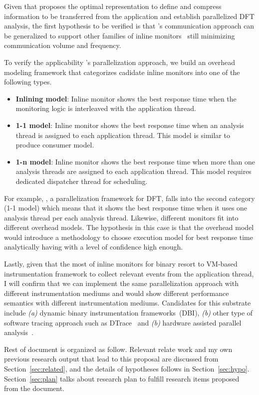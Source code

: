 %
%
Given that \sreplica proposes the optimal representation to define and compress
information to be transferred from the application and establish parallelized
DFT analysis, the first hypothesis to be verified is that \sreplica's
communication approach can be generalized to support other families of inline
monitors~\cite{cab:oopsala2009} still minimizing communication volume and
frequency.

To verify the applicability \sreplica's parallelization approach, we build an
overhead modeling framework that categorizes cadidate inline monitors into one
of the following types.

\begin{itemize}

    \item {\bf Inlining model}: Inline monitor shows the best response time
            when the monitoring logic is interleaved with the application
            thread.

    \item {\bf 1-1 model}: Inline monitor shows the best response time when an
            analysis thread is assigned to each application thread. This model
            is similar to produce consumer model.

    \item {\bf 1-n model}: Inline monitor shows the best response time when
            more than one analysis threads are assigned to each application
            thread.  This model requires dedicated dispatcher thread for
            scheduling.
    \end{itemize}

For example, \sreplica, a parallelization framework for DFT,  falls into the
second category (1-1 model) which means that it shows the best response time
when it uses one analysis thread per each analysis thread. Likewise, different
monitors fit into different overhead models. The hypothesis in this case is
that the overhead model would introduce a methodology to choose execution model
for best response time analytically having with a level of confidence high
enough.
 
Lastly, given that the most of inline monitors for binary resort to VM-based
instrumentation framework to collect relevant events from the application
thread, I will confirm that we can implement the same parallelization approach
with different instrumentation mediums and would show different performance
semantics with different instrumentation mediums. Candidates for this substrate
include {\it (a)} dynamic binary instrumentation frameworks~(DBI), {\it (b)}
other type of software tracing approach such as DTrace~\cite{DTrace} and {\it
(b)} hardware assisted parallel analysis~\cite{lba:isca2008}.

Rest of document is organized as follow. Relevant relate work and my own
previous research output that lead to this proposal are discussed from
Section~\ref{sec:related}, and the details of hypotheses follows in
Section~\ref{sec:hypo}. Section~\ref{sec:plan} talks about research plan to
fulfill research items proposed from the document.

